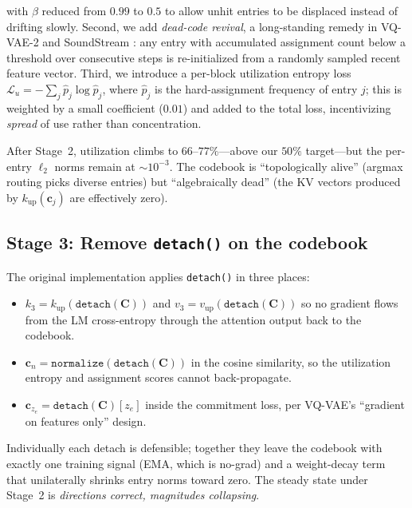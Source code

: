 \documentclass[11pt,a4paper]{article}
\begin{document}
with $\beta$ reduced from $0.99$ to $0.5$ to allow unhit entries to be displaced instead of
drifting slowly. Second, we add \textit{dead-code revival}, a long-standing remedy in
VQ-VAE-2 \citep{razavi2019generating} and SoundStream \citep{zeghidour2021soundstream}: any
entry with accumulated assignment count below a threshold over consecutive steps is
re-initialized from a randomly sampled recent feature vector. Third, we introduce a
per-block utilization entropy loss $\mathcal{L}_u = -\sum_j \hat{p}_j \log \hat{p}_j$, where
$\hat{p}_j$ is the hard-assignment frequency of entry $j$; this is weighted by a small
coefficient ($0.01$) and added to the total loss, incentivizing \textit{spread} of use
rather than concentration.

After Stage~2, utilization climbs to $66$--$77\%$---above our $50\%$ target---but the
per-entry $\ell_2$ norms remain at $\sim 10^{-3}$. The codebook is ``topologically alive''
(argmax routing picks diverse entries) but ``algebraically dead'' (the KV vectors produced
by $k_{\text{up}}(\bm{c}_j)$ are effectively zero).

\subsection{Stage 3: Remove \texttt{detach()} on the codebook}

The original implementation applies \texttt{detach()} in three places:

\begin{itemize}
  \item[$\Delta_1$] $k_3 = k_{\text{up}}(\texttt{detach}(\bm{C}))$ and
    $v_3 = v_{\text{up}}(\texttt{detach}(\bm{C}))$ so no gradient flows from the LM
    cross-entropy through the attention output back to the codebook.
  \item[$\Delta_2$] $\bm{c}_n = \texttt{normalize}(\texttt{detach}(\bm{C}))$ in the cosine
    similarity, so the utilization entropy and assignment scores cannot back-propagate.
  \item[$\Delta_3$] $\bm{c}_{z_e} = \texttt{detach}(\bm{C})[z_e]$ inside the commitment
    loss, per VQ-VAE's ``gradient on features only'' design.
\end{itemize}

Individually each detach is defensible; together they leave the codebook with exactly one
training signal (EMA, which is no-grad) and a weight-decay term that unilaterally shrinks
entry norms toward zero. The steady state under Stage~2 is \textit{directions correct,
magnitudes collapsing}.
\end{document}
